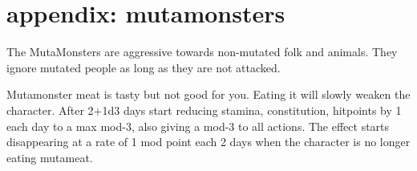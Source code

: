 
































\clearpage
\section*{appendix: mutamonsters}
\label{appendixmutamonsters}

\raggedbottom

The MutaMonsters are aggressive towards non-mutated folk and animals. They ignore mutated people as long as they are not attacked.

Mutamonster meat is tasty but not good for you. Eating it will slowly weaken the character. After 2+1d3 days start reducing stamina, constitution, hitpoints by 1 each day to a max mod-3, also giving a mod-3 to all actions. The effect starts disappearing at a rate of 1 mod point each 2 days when the character is no longer eating mutameat.

